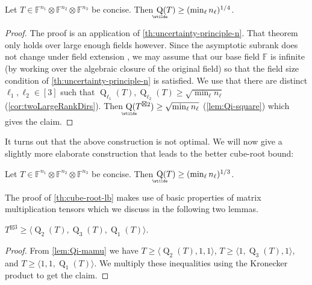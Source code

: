 \documentclass{daj}
\DeclareMathOperator{\subrank}{Q}
\DeclareMathOperator{\asympsubrank}{\underaccent{\wtilde}{Q}}
\newcommand{\FF}{\mathbb{F}}
\newcommand{\NN}{\mathbb{N}}
\begin{document}
\begin{theorem}\label{th:fourth-root}
    Let $T \in \FF^{n_1} \otimes \FF^{n_2} \otimes \FF^{n_3}$ be concise. Then $\asympsubrank(T) \geq (\min_\ell n_\ell)^{1/4}$.
\end{theorem}
\begin{proof}
The proof is an application of \autoref{th:uncertainty-principle-n}.
That theorem only holds over large enough fields however. 
Since the asymptotic subrank does not change under field extension \cite[Theorem~3.10]{strassen1988asymptotic}, we may assume that our base field $\FF$ is infinite (by working over the algebraic closure of the original field) so that the field size condition of \autoref{th:uncertainty-principle-n} is satisfied. %
We use that there are distinct $\ell_1, \ell_2 \in [3]$ such that 
$\subrank_{\ell_1}(T), \subrank_{\ell_2}(T) \geq \sqrt{\min_\ell n_\ell}$ (\autoref{cor:twoLargeRankDirs}).
Then $\asympsubrank(T^{\boxtimes 2}) \geq \sqrt{\min_\ell n_\ell}$ (\autoref{lem:Qi-square}) which gives the claim. %
\end{proof}




%

It turns out that the above construction is not optimal. We will now give a slightly more elaborate construction that leads to the better cube-root bound:

\begin{theorem}\label{th:cube-root-lb}
    Let $T \in \FF^{n_1} \otimes \FF^{n_2} \otimes \FF^{n_3}$ be concise. Then $\asympsubrank(T) \geq (\min_{\ell} n_\ell)^{1/3}$.
\end{theorem}

The proof of \autoref{th:cube-root-lb} makes use of basic properties of matrix multiplication tensors which we discuss in the following two lemmas. 

\begin{lemma}\label{lem:cube-mamu}
    $T^{\boxtimes 3} \geq \langle \subrank_2(T),\subrank_3(T),\subrank_1(T) \rangle.$
\end{lemma}

\begin{proof}
    From \autoref{lem:Qi-mamu} we have %
    $T \geq \langle \subrank_2(T),1,1\rangle$, 
    $T \geq \langle 1,\subrank_3(T),1\rangle$, and  
    $T \geq \langle 1,1,\subrank_1(T)\rangle$.
We multiply these inequalities using the Kronecker product to get the claim.
\end{proof}
\end{document}
